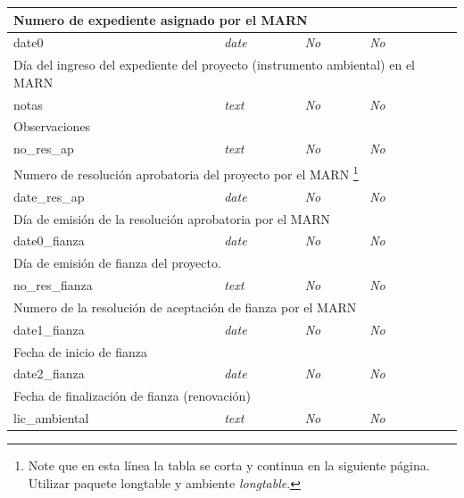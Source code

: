\begin{longtable}{|l|l|l|l|l|}
	\multicolumn{ 5}{|l|}{Numero de expediente asignado por el MARN} \\ \hline
		date0 & \textit{date} & \textit{No} & \textit{No} & \textit{} \\ \hline

	\multicolumn{ 5}{|l|}{Día del ingreso del expediente del proyecto (instrumento ambiental) en el MARN} \\ \hline
		notas & \textit{text} & \textit{No} & \textit{No} & \textit{} \\ \hline

	\multicolumn{ 5}{|l|}{Observaciones} \\ \hline
		no\_res\_ap & \textit{text} & \textit{No} & \textit{No} & \textit{} \\ \hline

	\multicolumn{ 5}{|l|}{Numero de resolución aprobatoria del proyecto por el MARN%
	\footnote{Note que en esta línea la tabla se corta y continua en la siguiente página. 
	Utilizar paquete \textsf{longtable} y ambiente \textit{longtable}.}} \\ \hline
		date\_res\_ap & \textit{date} & \textit{No} & \textit{No} & \textit{} \\ \hline

	\multicolumn{ 5}{|l|}{Día de emisión de la resolución aprobatoria por el MARN} \\ \hline
		date0\_fianza & \textit{date} & \textit{No} & \textit{No} & \textit{} \\ \hline

	\multicolumn{ 5}{|l|}{Día de emisión de fianza del proyecto.} \\ \hline
		no\_res\_fianza & \textit{text} & \textit{No} & \textit{No} & \textit{} \\ \hline

	\multicolumn{ 5}{|l|}{Numero de la resolución de aceptación de fianza por el MARN} \\ \hline
		date1\_fianza & \textit{date} & \textit{No} & \textit{No} & \textit{} \\ \hline

	\multicolumn{ 5}{|l|}{Fecha de inicio de fianza} \\ \hline
		date2\_fianza & \textit{date} & \textit{No} & \textit{No} & \textit{} \\ \hline

	\multicolumn{ 5}{|l|}{Fecha de finalización de fianza (renovación)} \\ \hline
		lic\_ambiental & \textit{text} & \textit{No} & \textit{No} & \textit{} \\ \hline


\end{longtable}
